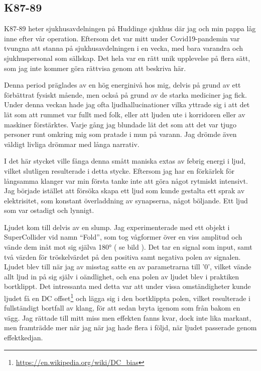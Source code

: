 \documentclass{article}
\begin{document}
\subsection{K87-89}
K87-89 heter sjukhusavdelningen på Huddinge sjukhus där jag och min pappa låg inne efter vår operation. 
Eftersom det var mitt under Covid19-pandemin var tvungna att stanna på sjukhusavdelningen i en vecka, med bara
varandra och sjukhuspersonal som sällskap. Det hela var en rätt unik upplevelse på flera sätt, som jag inte
kommer göra rättvisa genom att beskriva här. 

Denna period präglades av en hög energinivå hos mig, delvis på grund av ett förbättrat fysiskt mående, men
också på grund av de starka mediciner jag fick. Under denna veckan hade jag ofta ljudhallucinationer vilka
yttrade sig i att det lät som att rummet var fullt med folk, eller att ljuden ute i korridoren eller av
maskiner förstärktes. Varje gång jag blundade lät det som att det var tjugo personer runt omkring mig som
pratade i mun på varann. Jag drömde även väldigt livliga drömmar med långa narrativ. 

I det här stycket ville fånga denna smått maniska extas av febrig energi i ljud, vilket slutligen resulterade
i detta stycke. Eftersom jag har en förkärlek för långsamma klanger var min första tanke inte att göra något
rytmiskt intensivt. Jag började istället att försöka skapa ett ljud som kunde gestalta ett sprak av
elektrisitet, som konstant överladdning av synapserna, något böljande. Ett ljud som var ostadigt och lynnigt.

Ljudet kom till delvis av en slump. Jag experimenterade med ett objekt i SuperCollider vid namn ``Fold'', som
tog vågformer över en viss amplitud och vände dem inåt mot sig själva 180° ( se bild ). Det tar en signal som
input, samt två värden för tröskelvärdet på den positiva samt negativa polen av signalen. Ljudet blev till när
jag av misstag satte en av parametrarna till '0', vilket vände allt ljud in på sig själv i oändlighet, och ena
polen av ljudet blev i praktiken bortklippt. Det intressanta med detta var att under vissa omständigheter
kunde ljudet få en DC offset\footnote{\url{https://en.wikipedia.org/wiki/DC\_bias}} och lägga sig i den
bortklippta polen, vilket resulterade i fullständigt bortfall av klang, för att sedan bryta igenom som från
bakom en vägg. Jag rättade till mitt miss men effekten fanns kvar, dock inte lika markant, men framträdde mer
när jag när jag hade flera i följd, när ljudet passerade genom effektkedjan.
\end{document}
